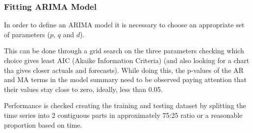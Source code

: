 %
%
    
\subsubsection{Fitting ARIMA Model}
\label{sec:fitting_arima_models}

In order to define an ARIMA model it is necessary to choose an appropriate set of
parameters ($p$, $q$ and $d$).

This can be done through a grid search on the three parameters checking which 
choice gives least AIC (Akaike Information Criteria) 
(and also looking for a chart tha gives closer actuals
and forecasts). While doing this, the p-values of the AR and MA terms
in the model summary need to be observed paying attention that their values
stay close to zero, ideally, less than 0.05.

Performance is checked creating the training and
testing dataset by splitting the time series into 2 contiguous parts in
approximately 75:25 ratio or a reasonable proportion based on time.

